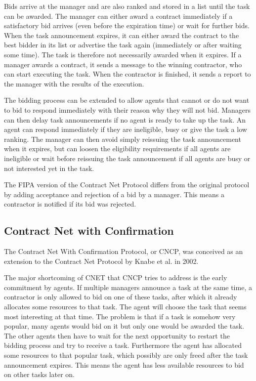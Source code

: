 \documentclass[10pt,a4paper]{article}
\begin{document}
Bids arrive at the manager and are also ranked and stored in a list until the task can be awarded. The manager can either award a contract immediately if a satisfactory bid arrives (even before the expiration time) or wait for further bids. When the task announcement expires, it can either award the contract to the best bidder in its list or advertise the task again (immediately or after waiting some time). The task is therefore not necessarily awarded when it expires. If a manager awards a contract, it sends a message to the winning contractor, who can start executing the task. When the contractor is finished, it sends a report to the manager with the results of the execution.

The bidding process can be extended to allow agents that cannot or do not want to bid to respond immediately with their reason why they will not bid. Managers can then delay task announcements if no agent is ready to take up the task. An agent can respond immediately if they are ineligible, busy or give the task a low ranking. The manager can then avoid simply reissuing the task announcement when it expires, but can loosen the eligibility requirements if all agents are ineligible or wait before reissuing the task announcement if all agents are busy or not interested yet in the task.

The FIPA version of the Contract Net Protocol \cite{CNETStandard} differs from the original protocol by adding acceptance and rejection of a bid by a manager. This means a contractor is notified if its bid was rejected.

\subsection{Contract Net with Confirmation} 
The Contract Net With Confirmation Protocol, or CNCP, was conceived as an extension to the Contract Net Protocol by Knabe et al. in 2002. \cite{CNCP}

The major shortcoming of CNET that CNCP tries to address is the early commitment by agents. If multiple managers announce a task at the same time, a contractor is only allowed to bid on one of these tasks, after which it already allocates some resources to that task. The agent will choose the task that seems most interesting at that time. The problem is that if a task is somehow very popular, many agents would bid on it but only one would be awarded the task. The other agents then have to wait for the next opportunity to restart the bidding process and try to receive a task. Furthermore the agent has allocated some resources to that popular task, which possibly are only freed after the task announcement expires. This means the agent has less available resources to bid on other tasks later on.
\end{document}
